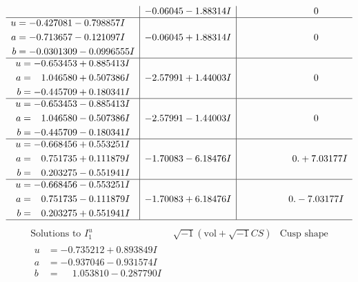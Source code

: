 \documentclass[1p]{elsarticle_modified}
\theoremstyle{definition}
\newcommand{\I}{\sqrt{-1}}
\begin{document}
$$\begin{array}{c|c|c}
 & -0.06045 - 1.88314 I & \phantom{-0.000000 } 0 \\ \hline\begin{aligned}
u &= -0.427081 - 0.798857 I \\
a &= -0.713657 - 0.121097 I \\
b &= -0.0301309 - 0.0996555 I\end{aligned}
 & -0.06045 + 1.88314 I & \phantom{-0.000000 } 0 \\ \hline\begin{aligned}
u &= -0.653453 + 0.885413 I \\
a &= \phantom{-}1.046580 + 0.507386 I \\
b &= -0.445709 + 0.180341 I\end{aligned}
 & -2.57991 + 1.44003 I & \phantom{-0.000000 } 0 \\ \hline\begin{aligned}
u &= -0.653453 - 0.885413 I \\
a &= \phantom{-}1.046580 - 0.507386 I \\
b &= -0.445709 - 0.180341 I\end{aligned}
 & -2.57991 - 1.44003 I & \phantom{-0.000000 } 0 \\ \hline\begin{aligned}
u &= -0.668456 + 0.553251 I \\
a &= \phantom{-}0.751735 + 0.111879 I \\
b &= \phantom{-}0.203275 - 0.551941 I\end{aligned}
 & -1.70083 - 6.18476 I & \phantom{-0.000000 -}0. + 7.03177 I \\ \hline\begin{aligned}
u &= -0.668456 - 0.553251 I \\
a &= \phantom{-}0.751735 - 0.111879 I \\
b &= \phantom{-}0.203275 + 0.551941 I\end{aligned}
 & -1.70083 + 6.18476 I & \phantom{-0.000000 } 0. - 7.03177 I\\
 \hline 
 \end{array}$$\newpage$$\begin{array}{c|c|c}  
\text{Solutions to }I^u_{1}& \I (\text{vol} + \sqrt{-1}CS) & \text{Cusp shape}\\
 \hline 
\begin{aligned}
u &= -0.735212 + 0.893849 I \\
a &= -0.937046 - 0.931574 I \\
b &= \phantom{-}1.053810 - 0.287790 I\end{aligned}

\end{array}$$
\end{document}
